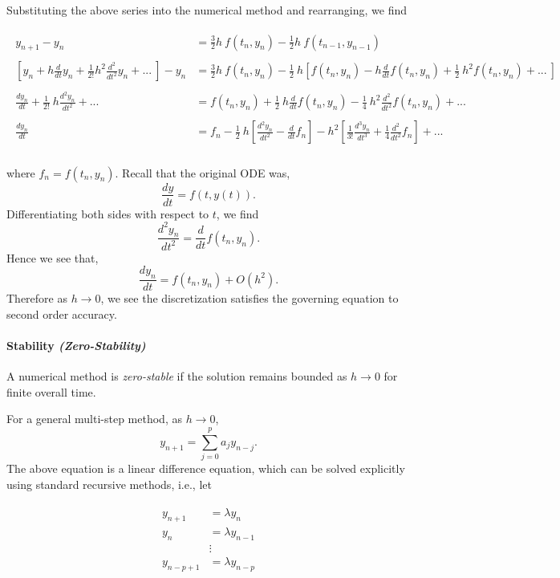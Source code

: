 \documentclass[paper=a4, fontsize=11pt]{scrartcl} %
\numberwithin{equation}{section} %
\numberwithin{figure}{section} %
\numberwithin{table}{section} %
\begin{document}
\begin{itemize}
Substituting the above series into the numerical method and rearranging, we find

\begin{align}
\nonumber
\begin{split}
y_{n+1} - y_n &= \frac{3}{2}h\ f(t_n,y_n) - \frac{1}{2} h\ f(t_{n-1},y_{n-1}) \\ \\
\left[ y_n + h \frac{d}{dt} y_n + \frac{1}{2!} h^2 \frac{d^2}{dt^2} y_{n} + ...\ \right] - y_n &= \frac{3}{2}h\ f(t_n,y_n) - \frac{1}{2}\ h\left[ f(t_n,y_n) - h \frac{d}{dt} f(t_n,y_n) + \frac{1}{2}\ h^2 f(t_n,y_n) + ... \  \right] \\ \\
\frac{dy_n}{dt}  + \frac{1}{2!}\ h \frac{d^2 y_n}{dt^2}  + ... &= f(t_n,y_n) +  \frac{1}{2}\ h \frac{d}{dt} f(t_n,y_n) - \frac{1}{4}\ h^2 \frac{d^2}{dt^2} f(t_n,y_n) + ... \\ \\
\frac{dy_n}{dt} &= f_n - \frac{1}{2}\ h\left[ \frac{d^2 y_n}{dt^2} -  \frac{d}{dt} f_n \right] - h^2 \left[ \frac{1}{3!} \frac{d^3 y_n}{dt^3} +  \frac{1}{4} \frac{d^2}{dt^2} f_n \right] + ... \\
\end{split}
\end{align}

where $f_n = f(t_n,y_n)$. Recall that the original ODE was, $$\frac{dy}{dt} = f(t,y(t)).$$ Differentiating both sides with respect to $t$, we find $$\frac{d^2 y_n}{dt^2} = \frac{d}{dt} f(t_n,y_n).$$ Hence we see that, $$\frac{dy_n}{dt} = f(t_n,y_n) + O(h^2).$$ Therefore as $h\rightarrow 0$, we see the discretization satisfies the governing equation to second order accuracy. 

\end{itemize}

\paragraph{Stability \emph{(Zero-Stability)} } A numerical method is \emph{zero-stable} if the solution remains bounded as $h\rightarrow 0$ for finite overall time. 

For a general multi-step method, as $h\rightarrow 0$, $$y_{n+1} = \sum_{j=0}^{p} a_{j} y_{n-j}.$$ The above equation is a linear difference equation, which can be solved explicitly using standard recursive methods, i.e., let 

\begin{align}
\nonumber
\begin{split}
y_{n+1} &= \lambda y_{n} \\
y_{n} &= \lambda y_{n-1} \\
&\vdots \\
y_{n-p+1} &= \lambda y_{n-p} \\
\end{split}
\end{align}
\end{document}
